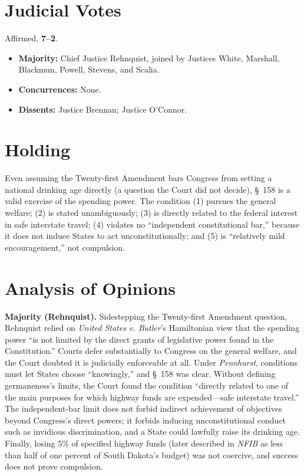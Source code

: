 \documentclass[12pt]{article}
\begin{document}
\section{Judicial Votes}

Affirmed, \textbf{7--2}.
\begin{itemize}
\item \textbf{Majority:} Chief Justice Rehnquist, joined by Justices White, Marshall, Blackmun, Powell, Stevens, and Scalia.
\item \textbf{Concurrences:} None.
\item \textbf{Dissents:} Justice Brennan; Justice O'Connor.
\end{itemize}

\section{Holding}

Even assuming the Twenty-first Amendment bars Congress from setting a national drinking age directly (a question the Court did not decide), \S~158 is a valid exercise of the spending power. The condition (1) pursues the general welfare; (2) is stated unambiguously; (3) is directly related to the federal interest in safe interstate travel; (4) violates no ``independent constitutional bar,'' because it does not induce States to act unconstitutionally; and (5) is ``relatively mild encouragement,'' not compulsion.

\section{Analysis of Opinions}

\textbf{Majority (Rehnquist).} Sidestepping the Twenty-first Amendment question, Rehnquist relied on \textit{United States v. Butler}'s Hamiltonian view that the spending power ``is not limited by the direct grants of legislative power found in the Constitution.'' Courts defer substantially to Congress on the general welfare, and the Court doubted it is judicially enforceable at all. Under \textit{Pennhurst}, conditions must let States choose ``knowingly,'' and \S~158 was clear. Without defining germaneness's limits, the Court found the condition ``directly related to one of the main purposes for which highway funds are expended---safe interstate travel.'' The independent-bar limit does not forbid indirect achievement of objectives beyond Congress's direct powers; it forbids inducing unconstitutional conduct such as invidious discrimination, and a State could lawfully raise its drinking age. Finally, losing 5\% of specified highway funds (later described in \textit{NFIB} as less than half of one percent of South Dakota's budget) was not coercive, and success does not prove compulsion.
\end{document}
